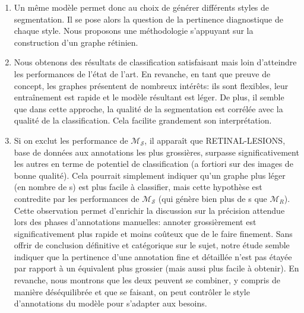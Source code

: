 \begin{enumerate}
	\item Un même modèle permet donc au choix de générer différents styles de segmentation. Il se pose alors la question de la pertinence diagnostique de chaque style. Nous proposons une méthodologie s'appuyant sur la construction d'un graphe rétinien.
	\item Nous obtenons des résultats de classification satisfaisant mais loin d'atteindre les performances de l'état de l'art. En revanche, en tant que preuve de concept, les graphes présentent de nombreux intérêts: ils sont flexibles,  leur entraînement est rapide et le modèle résultant est léger. De plus, il semble que dans cette approche, la qualité de la segmentation est corrélée avec la qualité de la classification. Cela facilite grandement son interprétation.
	\item Si on exclut les performance de $\mathcal{M}_\mathcal{S}$, il apparaît que RETINAL-LESIONS, base de données aux annotations les plus grossières, surpasse significativement les autres en terme de potentiel de classification (a fortiori sur des images de bonne qualité). Cela pourrait simplement indiquer qu'un graphe plus léger (en nombre de \noeud{}s) est plus facile à classifier, mais cette hypothèse est contredite par les performances de $\mathcal{M}_{\mathcal{S}}$ (qui génère bien plus de \noeud{}s que $\mathcal{M}_R$). Cette observation permet d'enrichir la discussion sur la précision attendue lors des phases d'annotations manuelles: annoter grossièrement est significativement plus rapide et moins coûteux que de le faire finement. Sans offrir de conclusion définitive et catégorique sur le sujet, notre étude semble indiquer que la pertinence d'une annotation fine et détaillée n'est pas étayée par rapport à un équivalent plus grossier (mais aussi plus facile à obtenir). En revanche, nous montrons que les deux peuvent se combiner, y compris de manière déséquilibrée et que se faisant, on peut contrôler le style d'annotations du modèle pour s'adapter aux besoins.
\end{enumerate}


